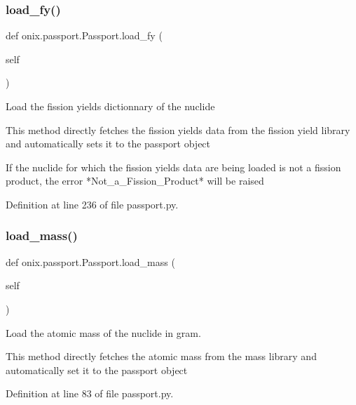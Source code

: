 \subsubsection{\texorpdfstring{load\+\_\+fy()}{load\_fy()}}
{\footnotesize\ttfamily def onix.\+passport.\+Passport.\+load\+\_\+fy (\begin{DoxyParamCaption}\item[{}]{self }\end{DoxyParamCaption})}

\begin{DoxyVerb}Load the fission yields dictionnary of the nuclide

This method directly fetches the fission yields data from the fission yield library and automatically sets
it to the passport object

If the nuclide for which the fission yields data are being loaded is not a fission product,
the error *Not_a_Fission_Product* will be raised\end{DoxyVerb}
 

Definition at line 236 of file passport.\+py.

\mbox{\label{classonix_1_1passport_1_1Passport_ab689c3046aa1fc714076a48f1564e5ee}} 
\subsubsection{\texorpdfstring{load\+\_\+mass()}{load\_mass()}}
{\footnotesize\ttfamily def onix.\+passport.\+Passport.\+load\+\_\+mass (\begin{DoxyParamCaption}\item[{}]{self }\end{DoxyParamCaption})}

\begin{DoxyVerb}Load the atomic mass of the nuclide in gram.

This method directly fetches the atomic mass from the mass library and automatically set it
to the passport object\end{DoxyVerb}
 

Definition at line 83 of file passport.\+py.

\mbox{\label{classonix_1_1passport_1_1Passport_a9c5b2cd3e81e98ec9c52c6429b049b68}} 
